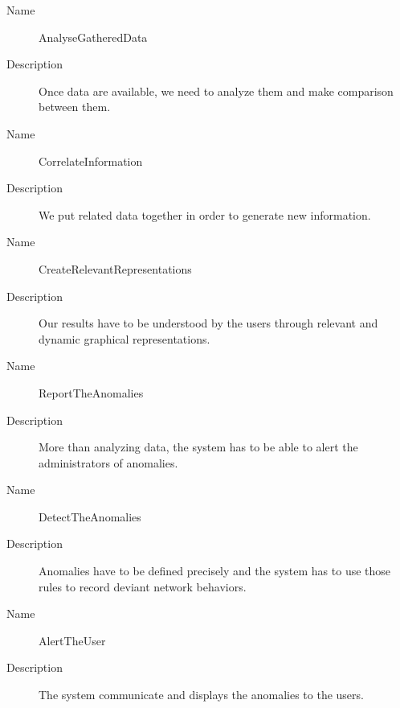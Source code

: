 \begin{description}
  \item[Name] AnalyseGatheredData
  \item[Description] Once data are available, we need to analyze them and make comparison between them.
\end{description}

\begin{description}
  \item[Name] CorrelateInformation
  \item[Description] We put related data together in order to generate new information.
\end{description}

\begin{description}
  \item[Name] CreateRelevantRepresentations
  \item[Description] Our results have to be understood by the users through relevant and dynamic graphical representations.
\end{description}

\begin{description}
  \item[Name] ReportTheAnomalies
  \item[Description] More than analyzing data, the system has to be able to alert the administrators of anomalies.
\end{description}

\begin{description}
  \item[Name] DetectTheAnomalies
  \item[Description] Anomalies have to be defined precisely and the system has to use those rules to record deviant network behaviors.
\end{description}

\begin{description}
  \item[Name] AlertTheUser
  \item[Description] The system communicate and displays the anomalies to the users.
\end{description}


